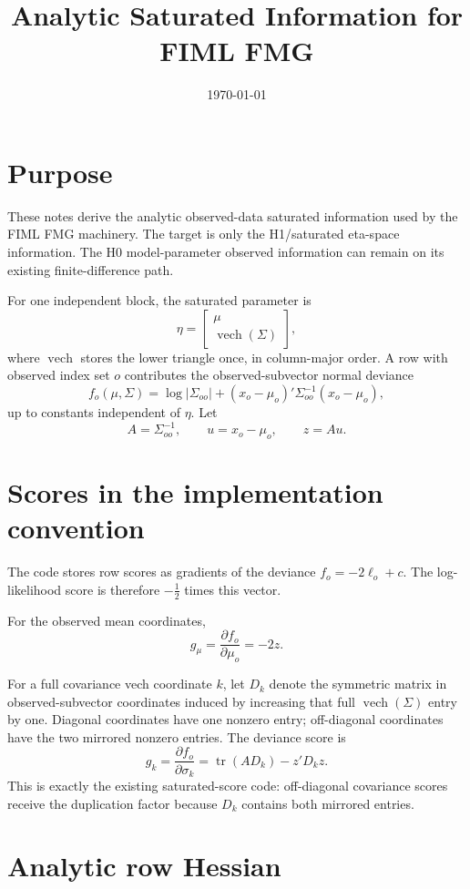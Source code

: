 \documentclass[11pt]{article}
\title{Analytic Saturated Information for FIML FMG}
\author{}
\date{\today}
\newcommand{\vech}{\operatorname{vech}}
\newcommand{\tr}{\operatorname{tr}}
\begin{document}
\maketitle

\section*{Purpose}

These notes derive the analytic observed-data saturated information used by
the FIML FMG machinery. The target is only the H1/saturated eta-space
information. The H0 model-parameter observed information can remain on its
existing finite-difference path.

For one independent block, the saturated parameter is
\[
  \eta = \begin{bmatrix}\mu \\ \vech(\Sigma)\end{bmatrix},
\]
where \(\vech\) stores the lower triangle once, in column-major order. A row
with observed index set \(o\) contributes the observed-subvector normal
deviance
\[
  f_o(\mu,\Sigma)
    = \log |\Sigma_{oo}|
      + (x_o-\mu_o)' \Sigma_{oo}^{-1} (x_o-\mu_o),
\]
up to constants independent of \(\eta\). Let
\[
  A = \Sigma_{oo}^{-1}, \qquad
  u = x_o-\mu_o, \qquad
  z = A u.
\]

\section*{Scores in the implementation convention}

The code stores row scores as gradients of the deviance \(f_o=-2\ell_o+c\).
The log-likelihood score is therefore \(-\frac12\) times this vector.

For the observed mean coordinates,
\[
  g_\mu = \frac{\partial f_o}{\partial \mu_o} = -2z.
\]

For a full covariance vech coordinate \(k\), let \(D_k\) denote the symmetric
matrix in observed-subvector coordinates induced by increasing that full
\(\vech(\Sigma)\) entry by one. Diagonal coordinates have one nonzero entry;
off-diagonal coordinates have the two mirrored nonzero entries. The deviance
score is
\[
  g_k
    = \frac{\partial f_o}{\partial \sigma_k}
    = \tr(A D_k) - z'D_kz.
\]
This is exactly the existing saturated-score code: off-diagonal covariance
scores receive the duplication factor because \(D_k\) contains both mirrored
entries.

\section*{Analytic row Hessian}
\end{document}
